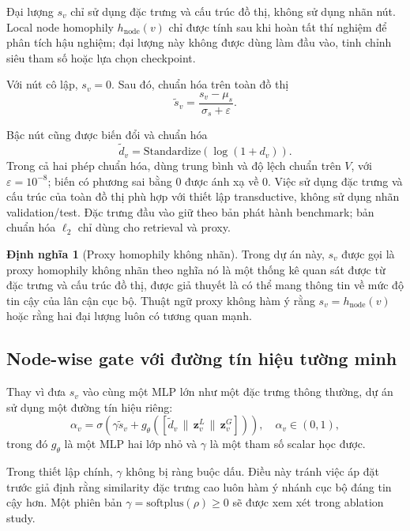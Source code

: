 \documentclass[12pt,a4paper]{article}
\numberwithin{equation}{section}
\theoremstyle{definition}
\newtheorem{definition}{Định nghĩa}[section]
\begin{document}
Đại lượng $s_v$ chỉ sử dụng đặc trưng và cấu trúc đồ thị, không sử dụng
nhãn nút. Local node homophily $h_{\mathrm{node}}(v)$ chỉ được tính sau
khi hoàn tất thí nghiệm để phân tích hậu nghiệm; đại lượng này không
được dùng làm đầu vào, tinh chỉnh siêu tham số hoặc lựa chọn checkpoint.
\medskip

Với nút cô lập, $s_v = 0$. Sau đó, chuẩn hóa trên toàn đồ thị
\begin{equation}
\tilde{s}_v = \frac{s_v - \mu_s}{\sigma_s + \varepsilon}.
\end{equation}

Bậc nút cũng được biến đổi và chuẩn hóa
\begin{equation}
\tilde{d}_v = \text{Standardize}\left(\log(1 + d_v)\right).
\end{equation}
Trong cả hai phép chuẩn hóa, dùng trung bình và độ lệch chuẩn trên $V$, với $\varepsilon=10^{-8}$; biến có phương sai bằng $0$ được ánh xạ về $0$. Việc sử dụng đặc trưng và cấu trúc của toàn đồ thị phù hợp với thiết lập transductive, không sử dụng nhãn validation/test. Đặc trưng đầu vào giữ theo bản phát hành benchmark; bản chuẩn hóa $\ell_2$ chỉ dùng cho retrieval và proxy.

\begin{definition}[Proxy homophily không nhãn]
Trong dự án này, $s_v$ được gọi là proxy homophily không nhãn theo nghĩa nó là một thống kê quan sát được từ đặc trưng và cấu trúc đồ thị, được giả thuyết là có thể mang thông tin về mức độ tin cậy của lân cận cục bộ. Thuật ngữ proxy không hàm ý rằng $s_v = h_{\text{node}}(v)$ hoặc rằng hai đại lượng luôn có tương quan mạnh.
\end{definition}

\subsection{Node-wise gate với đường tín hiệu tường minh}
Thay vì đưa $s_v$ vào cùng một MLP lớn như một đặc trưng thông thường, dự án sử dụng một đường tín hiệu riêng:
\begin{equation}
\alpha_v = \sigma\left(\gamma \tilde{s}_v + g_\theta\left([\tilde{d}_v \,\|\, \mathbf{z}_v^L \,\|\, \mathbf{z}_v^G]\right)\right), \quad \alpha_v \in (0, 1),
\end{equation}
trong đó $g_\theta$ là một MLP hai lớp nhỏ và $\gamma$ là một tham số scalar học được.

Trong thiết lập chính, $\gamma$ không bị ràng buộc dấu. Điều này tránh việc áp đặt trước giả định rằng similarity đặc trưng cao luôn hàm ý nhánh cục bộ đáng tin cậy hơn. Một phiên bản $\gamma = \text{softplus}(\rho) \ge 0$ sẽ được xem xét trong ablation study.
\end{document}
